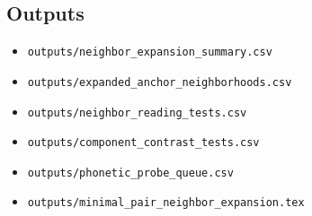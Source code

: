 \subsection{Outputs}

\begin{itemize}
  \item \texttt{outputs/neighbor\_expansion\_summary.csv}
  \item \texttt{outputs/expanded\_anchor\_neighborhoods.csv}
  \item \texttt{outputs/neighbor\_reading\_tests.csv}
  \item \texttt{outputs/component\_contrast\_tests.csv}
  \item \texttt{outputs/phonetic\_probe\_queue.csv}
  \item \texttt{outputs/minimal\_pair\_neighbor\_expansion.tex}
\end{itemize}
